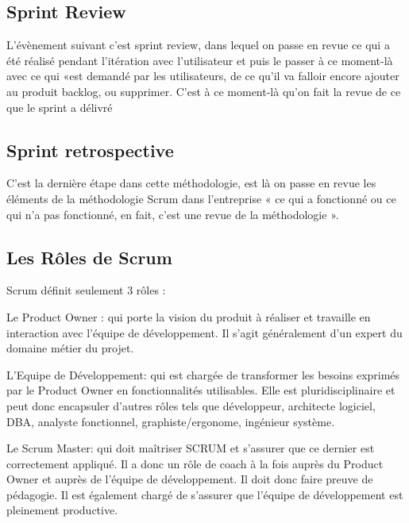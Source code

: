 \documentclass{article}           %
\begin{document}
\subsection{Sprint Review}
L’évènement suivant c’est sprint review, dans lequel on passe en revue ce qui a été réalisé
pendant l’itération avec l’utilisateur et puis le passer à ce moment-là avec ce qui «est demandé
par les utilisateurs, de ce qu’il va falloir encore ajouter au produit backlog, ou supprimer. C’est
à ce moment-là qu’on fait la revue de ce que le sprint a délivré

\subsection{Sprint retrospective}
C’est la dernière étape dans cette méthodologie, est là on passe en revue les éléments de la
méthodologie Scrum dans l’entreprise « ce qui a fonctionné ou ce qui n’a pas fonctionné, en
fait, c’est une revue de la méthodologie ».

\subsection{Les Rôles de Scrum}
Scrum définit seulement 3 rôles :
\item[Le Product Owner :] qui porte la vision du produit à réaliser et travaille en interaction
avec l’équipe de développement. Il s’agit généralement d’un expert du domaine métier
du projet.
\item[L’Equipe de Développement:] qui est chargée de transformer les besoins exprimés par le
Product Owner en fonctionnalités utilisables. Elle est pluridisciplinaire et peut donc
encapsuler d’autres rôles tels que développeur, architecte logiciel, DBA, analyste
fonctionnel, graphiste/ergonome, ingénieur système.
\item[Le Scrum Master: ] qui doit maîtriser SCRUM et s’assurer que ce dernier est correctement
appliqué. Il a donc un rôle de coach à la fois auprès du Product Owner et auprès de
l’équipe de développement. Il doit donc faire preuve de pédagogie. Il est également
chargé de s’assurer que l’équipe de développement est pleinement productive. 
\end{document}
